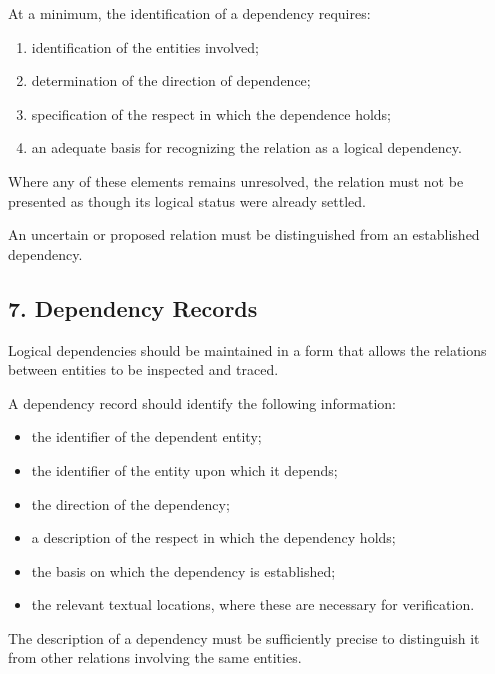 At a minimum, the identification
of a dependency requires:

\begin{enumerate}
    \item identification of the
    entities involved;
    \item determination of the
    direction of dependence;
    \item specification of the
    respect in which the dependence
    holds;
    \item an adequate basis for
    recognizing the relation
    as a logical dependency.
\end{enumerate}

Where any of these elements
remains unresolved, the relation
must not be presented as though
its logical status were already
settled.

An uncertain or proposed relation
must be distinguished from an
established dependency.


\subsection*{7. Dependency Records}

Logical dependencies should
be maintained in a form that
allows the relations between
entities to be inspected and
traced.

A dependency record should
identify the following information:

\begin{itemize}
    \item the identifier of the
    dependent entity;
    \item the identifier of the
    entity upon which it depends;
    \item the direction of the
    dependency;
    \item a description of the
    respect in which the dependency
    holds;
    \item the basis on which
    the dependency is established;
    \item the relevant textual
    locations, where these are
    necessary for verification.
\end{itemize}

The description of a dependency
must be sufficiently precise
to distinguish it from other
relations involving the same
entities.

